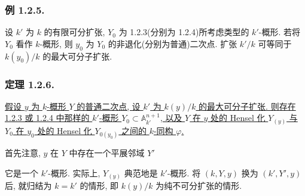 \subsubsection*{例 1.2.5.}
设 $k'$ 为 $k$ 的有限可分扩张, $Y_0$ 为 1.2.3(分别为 1.2.4)所考虑类型的 $k'$-概形. 若将 $Y_0$ 看作 $k$-概形, 则 $y_0$ 为 $Y_0$ 的非退化(分别为普通)二次点. 扩张 $k'/k$ 可等同于 $k(y_0)/k$ 的最大可分子扩张.

\subsubsection*{定理 1.2.6.}
\underline{假设 $y$ 为 $k$-概形 $Y$ 的普通二次点, 设 $k'$ 为 $k(y)/k$ 的最大可分子扩张. 则存在 1.2.3 或 1.2.4 中那样的 $k'$-概形 $Y_0\subset\mathbb A_{k'}^{n+1}$, 以及 $Y$ 在 $y$ 处的 Hensel 化 $Y_{(y)}$ 与 $Y_0$ 在 $y_0$ 处的 Hensel 化 $Y_{0(y_0)}$ 之间的 $k$-同构 $\varphi$.}

首先注意, $y$ 在 $Y$ 中存在一个平展邻域 $Y'$
\begin{center}
\end{center}
它是一个 $k'$-概形. 实际上, $Y_{(y)}$ 典范地是 $k'$-概形. 将 $(k,Y,y)$ 换为 $(k',Y',y)$ 后, 就归结为 $k=k'$ 的情形, 即 $k(y)/k$ 为纯不可分扩张的情形.
